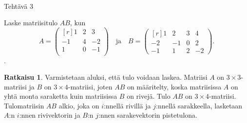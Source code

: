 \documentclass[12pt, a4paper, t]{beamer}
\theoremstyle{exercise}
\theoremstyle{remark}
\theoremstyle{definition}
\newtheorem*{rat}{Ratkaisu}
\begin{document}
\begin{frame}{Tehtävä 3}

\vspace{12pt}
\begin{tcolorbox} Laske matriisitulo $AB$, kun
$$
A=\begin{pmatrix*}[r]
1 & 2 & 3\\
-1 & 4 & -2\\
1 & 0&-1\\
\end{pmatrix*}\quad\text{ja}\quad B=\begin{pmatrix*}[r]
1 & 2 & 3 &4\\
-2 & -1 & 0 & 2\\
-1 & 1 & 2 &-2
\end{pmatrix*}.
$$.\end{tcolorbox}

\vspace{100pt}

\begin{rat}
Varmistetaan aluksi, että tulo voidaan laskea. Matriisi $A$ on $3\times 3$-matriisi ja $B$ on $3\times 4$-matriisi, joten $AB$ on määritelty, koska matriisissa $A$ on yhtä monta saraketta kuin matriisissa $B$ on rivejä. Tulo $AB$ on $3\times 4$-matriisi. Tulomatriisin $AB$ alkio, joka on $i$:nnellä rivillä ja $j$:nnellä sarakkeella, lasketaan $A$:n $i$:nnen rivivektorin ja $B$:n $j$:nnen sarakevektorin pistetulona.
\end{rat}

\end{frame}
\end{document}
